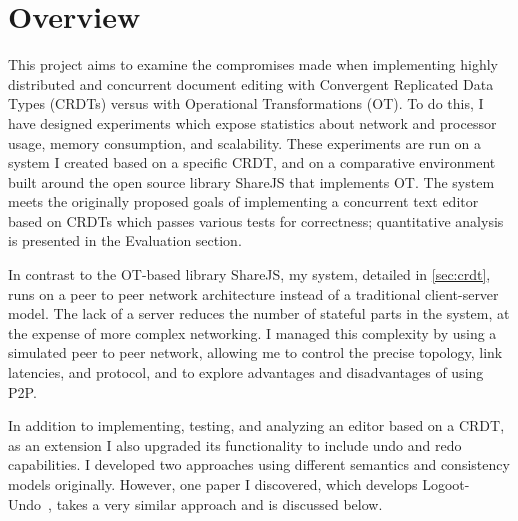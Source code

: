 \documentclass[12pt,a4paper,twoside,openright]{report}
\begin{document}


\section{Overview}
This project aims to examine the compromises made when implementing highly distributed and concurrent document editing with Convergent Replicated Data Types (CRDTs) versus with Operational Transformations (OT). To do this, I have designed experiments which expose statistics about network and processor usage, memory consumption, and scalability. These experiments are run on a system I created based on a specific CRDT, and on a comparative environment built around the open source library ShareJS that implements OT. The system meets the originally proposed goals of implementing a concurrent text editor based on CRDTs which passes various tests for correctness; quantitative analysis is presented in the Evaluation section. 

In contrast to the OT-based library ShareJS, my system, detailed in \cref{sec:crdt}, runs on a peer to peer network architecture instead of a traditional client-server model. The lack of a server reduces the number of stateful parts in the system, at the expense of more complex networking. I managed this complexity by using a simulated peer to peer network, allowing me to control the precise topology, link latencies, and protocol, and to explore advantages and disadvantages of using P2P.

In addition to implementing, testing, and analyzing an editor based on a CRDT, as an extension I also upgraded its functionality to include undo and redo capabilities. I developed two approaches using different semantics and consistency models originally. However, one paper I discovered, which develops Logoot-Undo~\cite{weiss2010undo}, takes a very similar approach and is discussed below.
\end{document}

